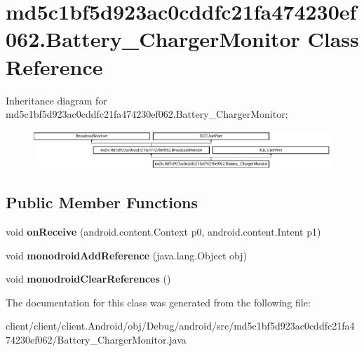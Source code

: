 \hypertarget{classmd5c1bf5d923ac0cddfc21fa474230ef062_1_1Battery__ChargerMonitor}{}\section{md5c1bf5d923ac0cddfc21fa474230ef062.\+Battery\+\_\+\+Charger\+Monitor Class Reference}
\label{classmd5c1bf5d923ac0cddfc21fa474230ef062_1_1Battery__ChargerMonitor}
Inheritance diagram for md5c1bf5d923ac0cddfc21fa474230ef062.\+Battery\+\_\+\+Charger\+Monitor\+:\begin{figure}[H]
\begin{center}
\leavevmode
\includegraphics[height=1.414141cm]{classmd5c1bf5d923ac0cddfc21fa474230ef062_1_1Battery__ChargerMonitor}
\end{center}
\end{figure}
\subsection*{Public Member Functions}
\begin{DoxyCompactItemize}
\item 
\hypertarget{classmd5c1bf5d923ac0cddfc21fa474230ef062_1_1Battery__ChargerMonitor_a2ce472cf4651bec2bbfecafc0ab2140d}{}void {\bfseries on\+Receive} (android.\+content.\+Context p0, android.\+content.\+Intent p1)\label{classmd5c1bf5d923ac0cddfc21fa474230ef062_1_1Battery__ChargerMonitor_a2ce472cf4651bec2bbfecafc0ab2140d}

\item 
\hypertarget{classmd5c1bf5d923ac0cddfc21fa474230ef062_1_1Battery__ChargerMonitor_a92994e7e754cf02b3bbb12469309ffca}{}void {\bfseries monodroid\+Add\+Reference} (java.\+lang.\+Object obj)\label{classmd5c1bf5d923ac0cddfc21fa474230ef062_1_1Battery__ChargerMonitor_a92994e7e754cf02b3bbb12469309ffca}

\item 
\hypertarget{classmd5c1bf5d923ac0cddfc21fa474230ef062_1_1Battery__ChargerMonitor_a00ae41c7a2f414b05dc74915432c0db5}{}void {\bfseries monodroid\+Clear\+References} ()\label{classmd5c1bf5d923ac0cddfc21fa474230ef062_1_1Battery__ChargerMonitor_a00ae41c7a2f414b05dc74915432c0db5}

\end{DoxyCompactItemize}


The documentation for this class was generated from the following file\+:\begin{DoxyCompactItemize}
\item 
client/client/client.\+Android/obj/\+Debug/android/src/md5c1bf5d923ac0cddfc21fa474230ef062/Battery\+\_\+\+Charger\+Monitor.\+java\end{DoxyCompactItemize}
